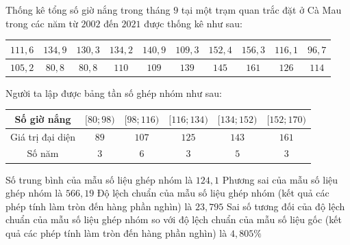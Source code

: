 \begin{ex}%
	Thống kê tổng số giờ nắng trong tháng $9$ tại một trạm quan trắc đặt ở Cà Mau trong các năm từ $2002$ đến $2021$ được thống kê như sau:
	\begin{center}
		\begin{tabular}{|c|c|c|c|c|c|c|c|c|c|}
			\hline $111{,}6$&$134{,}9$&$130{,}3$&$134{,}2$&$140{,}9$&$109{,}3$&$152{,}4$&$156{,}3$&$116{,}1$&$96{,}7$\\
			\hline $105{,}2$&$80{,}8$&$80{,}8$&$110$&$109$&$139$&$145$&$161$&$126$&$114$\\
			\hline
		\end{tabular}
	\end{center}
	Người ta lập được bảng tần số ghép nhóm như sau:
	\begin{center}
		\begin{tabular}{|c|c|c|c|c|c|}
			\hline Số giờ nắng&{$[80;98)$}&{$[98;116)$}&$[116;134)$&$[134;152)$&$[152;170)$\\
			\hline Giá trị đại diện&$89$&$107$&$125$&$143$&$161$\\
			\hline Số năm&$3$&$6$&$3$&$5$&$3$\\
			\hline
		\end{tabular}
	\end{center}
	\choiceTF
	{\True Số trung bình của mẫu số liệu ghép nhóm là $124{,}1$}
	{\True Phương sai của mẫu số liệu ghép nhóm là $566{,}19$}
	{\True Độ lệch chuẩn của mẫu số liệu ghép nhóm (kết quả các phép tính làm tròn đến hàng phần nghìn) là $23{,}795$}
	{\True Sai số tương đối của độ lệch chuẩn của mẫu số liệu ghép nhóm so với độ lệch chuẩn của mẫu số liệu gốc (kết quả các phép tính làm tròn đến hàng phần nghìn) là $4{,}805 \%$}
\end{ex}
